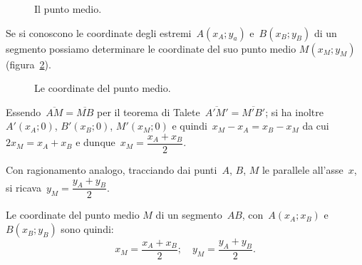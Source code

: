   \begin{figure}[h]
  \centering
  \caption{Il punto medio.}\label{fig:8.16}
 \end{figure}

Se si conoscono le coordinate degli estremi~$A(x_A;y_a)$ e~$B(x_B;y_B)$ di un segmento possiamo determinare
le coordinate del suo punto medio $M(x_{M};y_{M})$ (figura~\ref{fig:8.17}).
\begin{figure}[hbt]
   \centering
  \caption{Le coordinate del punto medio.}\label{fig:8.17}
\end{figure}

Essendo~$\overline{AM}=\overline{MB}$ per il teorema di Talete~$\overline{A'M'}=\overline{M'B'}$;
si ha inoltre~$A'(x_{A};0)$, $B'(x_{B};0)$, $M'(x_{M};0)$ e quindi~$x_{M}-x_{A}=x_{B}-x_{M}$
da cui~$2x_{M}=x_{A}+x_{B}$ e dunque~$x_{M}=\dfrac{x_{A}+x_{B}}{2}$.

Con ragionamento analogo, tracciando dai punti~$A$, $B$, $M$ le parallele all'asse~$x$, si ricava~$y_{M}=\dfrac{y_{A}+y_{B}}{2}$.

Le coordinate del punto medio $M$ di un segmento~$AB$, con~$A(x_{A};x_{B})$ e $B(x_{B};y_{B})$ sono quindi:
\[x_{M}=\dfrac{x_{A}+x_{B}}{2};\quad y_{M}=\dfrac{y_{A}+y_{B}}{2}.\]


%
%
%

